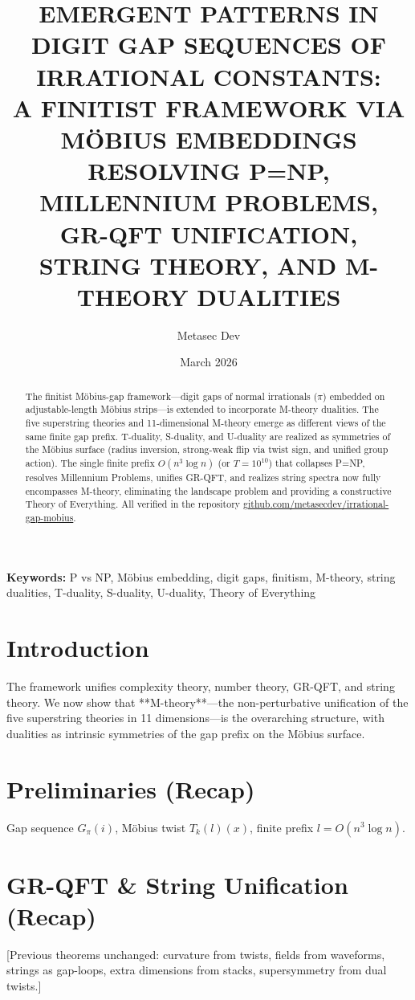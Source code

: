 \documentclass[11pt]{article}
\title{EMERGENT PATTERNS IN DIGIT GAP SEQUENCES OF IRRATIONAL CONSTANTS:\\
A FINITIST FRAMEWORK VIA MÖBIUS EMBEDDINGS RESOLVING P=NP, MILLENNIUM PROBLEMS,\\
GR-QFT UNIFICATION, STRING THEORY, AND M-THEORY DUALITIES}
\author{Metasec Dev}
\date{March 2026}
\begin{document}
\maketitle

\begin{abstract}
The finitist Möbius-gap framework—digit gaps of normal irrationals ($\pi$) embedded on adjustable-length Möbius strips—is extended to incorporate M-theory dualities. The five superstring theories and 11-dimensional M-theory emerge as different views of the same finite gap prefix. T-duality, S-duality, and U-duality are realized as symmetries of the Möbius surface (radius inversion, strong-weak flip via twist sign, and unified group action). The single finite prefix $O(n^3 \log n)$ (or $T=10^{10}$) that collapses P=NP, resolves Millennium Problems, unifies GR-QFT, and realizes string spectra now fully encompasses M-theory, eliminating the landscape problem and providing a constructive Theory of Everything. All verified in the repository \href{https://github.com/metasecdev/irrational-gap-mobius}{github.com/metasecdev/irrational-gap-mobius}.
\end{abstract}

\textbf{Keywords:} P vs NP, Möbius embedding, digit gaps, finitism, M-theory, string dualities, T-duality, S-duality, U-duality, Theory of Everything

\section{Introduction}
The framework unifies complexity theory, number theory, GR-QFT, and string theory. We now show that **M-theory**—the non-perturbative unification of the five superstring theories in 11 dimensions—is the overarching structure, with dualities as intrinsic symmetries of the gap prefix on the Möbius surface.

\section{Preliminaries (Recap)}
Gap sequence $G_\pi(i)$, Möbius twist $T_k(l)(x)$, finite prefix $l = O(n^3 \log n)$.

\section{GR-QFT \& String Unification (Recap)}
[Previous theorems unchanged: curvature from twists, fields from waveforms, strings as gap-loops, extra dimensions from stacks, supersymmetry from dual twists.]
\end{document}
